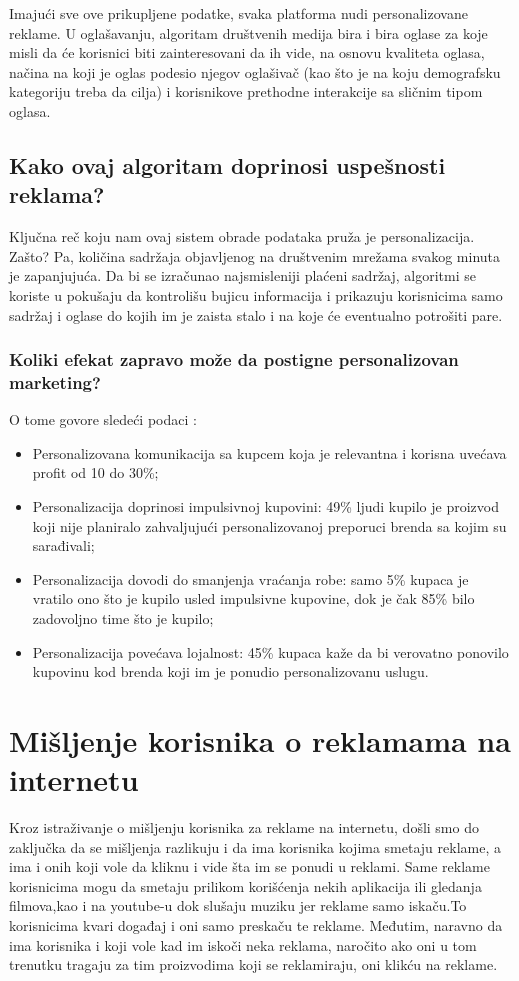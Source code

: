 \documentclass[a4paper]{article}
\begin{document}
	Imajući sve ove prikupljene podatke, svaka platforma nudi personalizovane reklame.  U oglašavanju, algoritam društvenih medija bira i bira oglase za koje misli da će korisnici biti zainteresovani da ih vide, na osnovu kvaliteta oglasa, načina na koji je oglas podesio njegov 		oglašivač (kao što je na koju demografsku kategoriju treba da cilja) i korisnikove prethodne interakcije sa sličnim tipom oglasa.  \cite{algoritmi}
	
	\subsection{Kako ovaj algoritam doprinosi uspešnosti reklama?}
	\label{subsec:uspesnostreklama}
	Ključna reč koju nam ovaj sistem obrade podataka pruža je personalizacija. Zašto? Pa, količina sadržaja objavljenog na društvenim mrežama svakog minuta je zapanjujuća. Da bi se izračunao najsmisleniji plaćeni sadržaj, algoritmi se koriste u pokušaju da kontrolišu bujicu 		informacija i prikazuju korisnicima samo sadržaj i oglase do kojih im je zaista stalo i na koje će eventualno potrošiti pare.
	\subsubsection{Koliki efekat zapravo može da postigne personalizovan marketing?}
	O tome govore sledeći podaci \cite{statistikai}:
	\begin{itemize}
		\item Personalizovana komunikacija sa kupcem koja je relevantna i korisna uvećava profit od 10 do 30\%;
		\item Personalizacija doprinosi impulsivnoj kupovini: 49\% ljudi kupilo je proizvod koji nije planiralo zahvaljujući personalizovanoj preporuci brenda sa kojim su sarađivali;
		\item Personalizacija dovodi do smanjenja vraćanja robe: samo 5\% kupaca je vratilo ono što je kupilo usled impulsivne kupovine, dok je čak 85\% bilo zadovoljno time što je kupilo;
		\item Personalizacija povećava lojalnost: 45\% kupaca kaže da bi verovatno ponovilo kupovinu kod brenda koji im je ponudio personalizovanu uslugu.
	\end{itemize} 
	
	
	\section{Mišljenje korisnika o reklamama na internetu}
	\label{sec:misljenje}
	Kroz istraživanje o mišljenju korisnika za reklame na internetu, došli smo do zaključka da se mišljenja razlikuju i da ima korisnika kojima smetaju reklame, a ima i onih koji vole da kliknu i vide šta im se ponudi u reklami.
	Same reklame korisnicima mogu da smetaju prilikom korišćenja nekih aplikacija ili gledanja filmova,kao i na youtube-u dok slušaju muziku jer reklame samo iskaču.To korisnicima kvari događaj i oni samo preskaču te reklame.
	Međutim, naravno da ima korisnika i koji vole kad im iskoči neka reklama, naročito ako oni u tom trenutku tragaju za tim proizvodima koji se reklamiraju, oni klikću na reklame.
\end{document}
